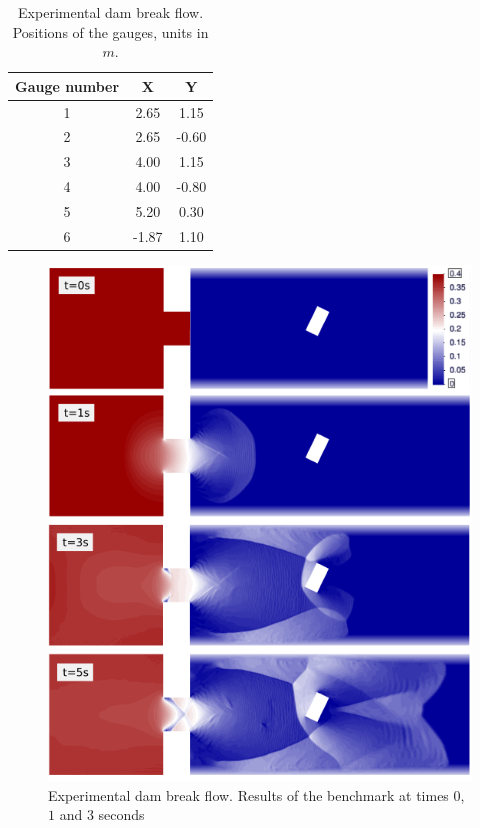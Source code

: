 \documentclass[a4paper,12pt]{article}
\begin{document}
\begin{table}
\centering
\begin{tabular}{ccc}
\hline
Gauge number & X & Y \\ \hline
1 &  2.65 &  1.15 \\
2 &  2.65 & -0.60 \\
3 &  4.00 &  1.15 \\
4 &  4.00 & -0.80 \\
5 &  5.20 &  0.30 \\
6 & -1.87 &  1.10 \\ \hline
\end{tabular}
\caption{Experimental dam break flow. Positions of the gauges, units in $m$.}
\label{gauges_positions}
\end{table}


\begin{figure}
\centering
\includegraphics[width=\textwidth]{img/exp/results.png}
\caption{Experimental dam break flow. Results of the benchmark at times $0$, $1$ and $3$ seconds}
\label{experiment_plots}
\end{figure}
\end{document}
